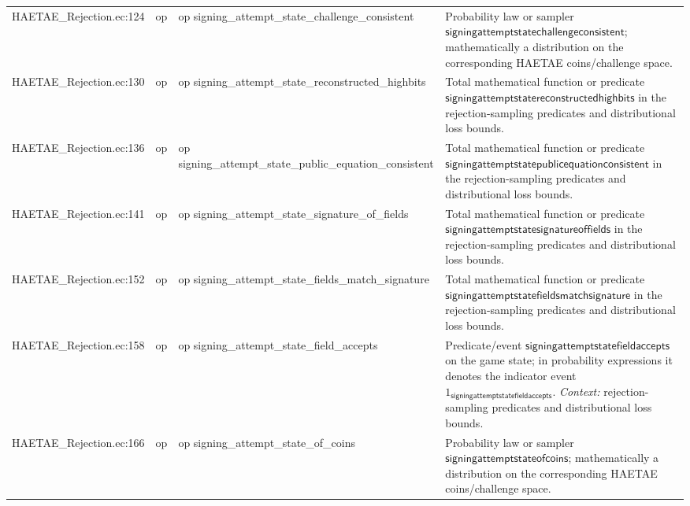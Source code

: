 \documentclass[10pt]{article}
\begin{document}
\begin{longtable}{L{0.11\textwidth}L{0.055\textwidth}L{0.385\textwidth}L{0.41\textwidth}}
HAETAE\_\allowbreak{}Rejection.\allowbreak{}ec:\allowbreak{}124 & op & {\ttfamily\scriptsize op signing\_\allowbreak{}attempt\_\allowbreak{}state\_\allowbreak{}challenge\_\allowbreak{}consistent} & Probability law or sampler $\mathsf{signingattemptstatechallengeconsistent}$; mathematically a distribution on the corresponding HAETAE coins/challenge space. \\
HAETAE\_\allowbreak{}Rejection.\allowbreak{}ec:\allowbreak{}130 & op & {\ttfamily\scriptsize op signing\_\allowbreak{}attempt\_\allowbreak{}state\_\allowbreak{}reconstructed\_\allowbreak{}highbits} & Total mathematical function or predicate $\mathsf{signingattemptstatereconstructedhighbits}$ in the rejection-sampling predicates and distributional loss bounds. \\
HAETAE\_\allowbreak{}Rejection.\allowbreak{}ec:\allowbreak{}136 & op & {\ttfamily\scriptsize op signing\_\allowbreak{}attempt\_\allowbreak{}state\_\allowbreak{}public\_\allowbreak{}equation\_\allowbreak{}consistent} & Total mathematical function or predicate $\mathsf{signingattemptstatepublicequationconsistent}$ in the rejection-sampling predicates and distributional loss bounds. \\
HAETAE\_\allowbreak{}Rejection.\allowbreak{}ec:\allowbreak{}141 & op & {\ttfamily\scriptsize op signing\_\allowbreak{}attempt\_\allowbreak{}state\_\allowbreak{}signature\_\allowbreak{}of\_\allowbreak{}fields} & Total mathematical function or predicate $\mathsf{signingattemptstatesignatureoffields}$ in the rejection-sampling predicates and distributional loss bounds. \\
HAETAE\_\allowbreak{}Rejection.\allowbreak{}ec:\allowbreak{}152 & op & {\ttfamily\scriptsize op signing\_\allowbreak{}attempt\_\allowbreak{}state\_\allowbreak{}fields\_\allowbreak{}match\_\allowbreak{}signature} & Total mathematical function or predicate $\mathsf{signingattemptstatefieldsmatchsignature}$ in the rejection-sampling predicates and distributional loss bounds. \\
HAETAE\_\allowbreak{}Rejection.\allowbreak{}ec:\allowbreak{}158 & op & {\ttfamily\scriptsize op signing\_\allowbreak{}attempt\_\allowbreak{}state\_\allowbreak{}field\_\allowbreak{}accepts} & Predicate/event $\mathsf{signingattemptstatefieldaccepts}$ on the game state; in probability expressions it denotes the indicator event $1_{\mathsf{signingattemptstatefieldaccepts}}$. \emph{Context:} rejection-sampling predicates and distributional loss bounds. \\
HAETAE\_\allowbreak{}Rejection.\allowbreak{}ec:\allowbreak{}166 & op & {\ttfamily\scriptsize op signing\_\allowbreak{}attempt\_\allowbreak{}state\_\allowbreak{}of\_\allowbreak{}coins} & Probability law or sampler $\mathsf{signingattemptstateofcoins}$; mathematically a distribution on the corresponding HAETAE coins/challenge space. \\

\end{longtable}
\end{document}
